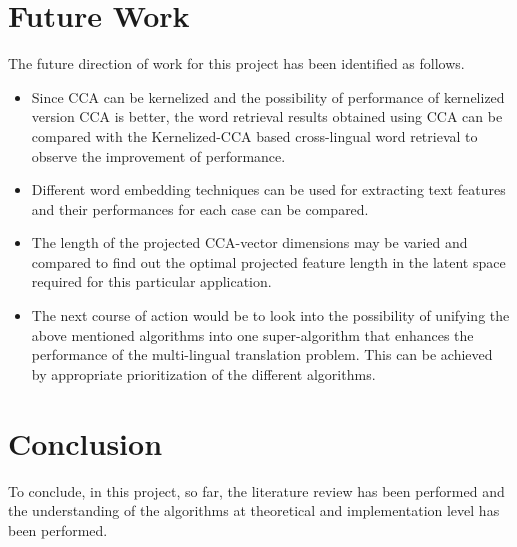 \documentclass{article} %
\begin{document}
	
	\section{Future Work}
	The future direction of work for this project has been identified as follows.
	\begin{itemize}
		\item Since CCA can be kernelized and the possibility of performance of kernelized version CCA is better, the word retrieval results obtained using CCA can be compared with the Kernelized-CCA based cross-lingual word retrieval to observe the improvement of performance.
		\item Different word embedding techniques can be used for extracting text features and their performances for each case can be compared.
		\item The length of the projected CCA-vector dimensions may be varied and compared to find out the optimal projected feature length in the latent space required for this particular application.
		\item The next course of action would be to look into the possibility of unifying the above mentioned algorithms into one super-algorithm that enhances the performance of the multi-lingual translation problem. This can be achieved by appropriate prioritization of the different algorithms.
	\end{itemize}
	
	
	
	
	
	\section{Conclusion}
	To conclude, in this project, so far, the literature review has been performed and the understanding of the algorithms at theoretical and implementation level has been performed. 
	
	
	
\end{document}
